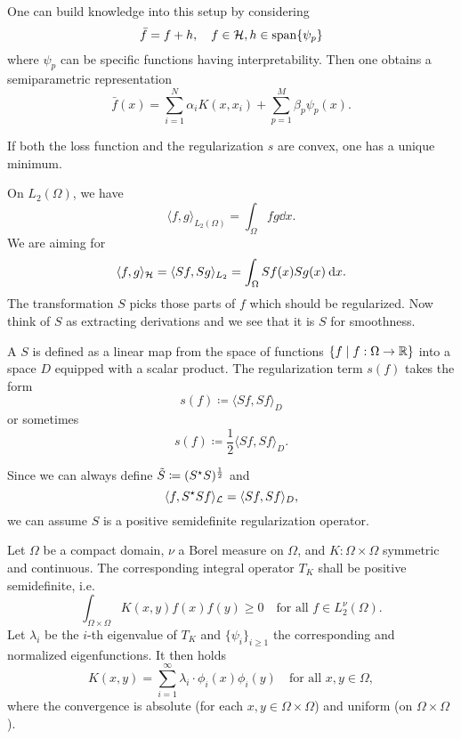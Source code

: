 \documentclass[../lecture-notes.tex]{subfiles}
\begin{document}
\begin{remark}
One can build knowledge into this setup by considering
\[
\bar{f} = f + h, \quad f \in \mathcal{H}, h \in \operatorname*{span}\{ \psi_p \}
\]
where $\psi_p$ can be specific functions having interpretability.
Then one obtains a semiparametric representation
\[
\bar{f}(x) = \sum_{i=1}^N \alpha_i K(x, x_i) + \sum_{p=1}^M \beta_p \psi_p(x).
\]
\end{remark}
\begin{remark}
If both the loss function and the regularization $s$ are convex, one has a unique minimum.
\end{remark}
On $L_2(\Omega)$, we have
\[
	\langle f, g \rangle_{L_2(\Omega)} = \int_\Omega fg \dd x.
\]
We are aiming for
\[
	\langle f, g \rangle_{\mathcal{H}} = \langle Sf, Sg \rangle_{L_2} = \int_\Omega Sf(x) Sg(x) \:\mathrm{d} x.
\]
The transformation $S$ picks those parts of $f$ which should be regularized. Now think of $S$ as extracting derivations and we see that it is $S$ for smoothness.
\begin{definition} %
\label{thm:42}
A  $S$ is defined as a linear map from the space of functions $\{ f \mid f : \Omega \to \mathbb{R} \}$ into a space $D$ equipped with a scalar product.
The regularization term $s(f)$ takes the form
\[
	s(f) \coloneqq \langle Sf, Sf \rangle_D
\]
or sometimes
\[
	s(f) \coloneqq \frac{1}{2} \langle Sf, Sf \rangle_D.
\]
\end{definition}
\begin{remark}
Since we can always define $\tilde{S} \coloneqq (S^{\star} S)^{\frac{1}{2}}$ and
\[
	\langle f, S^{\star} S f \rangle_{\mathcal{L}} = \langle Sf, Sf \rangle_D,
\]
we can assume $S$ is a positive semidefinite regularization operator.
\end{remark}
\begin{theorem} %
\label{thm:43}
Let $\Omega$ be a compact domain, $\nu$ a Borel measure on $\Omega$, and $K : \Omega \times \Omega$ symmetric and continuous.
The corresponding integral operator $T_K$ shall be positive semidefinite, i.e.
\[
	\int_{\Omega \times \Omega} K(x, y) f(x) f(y) \geq 0 \quad \text{for all } f \in L_2^\nu(\Omega).
\]
Let $\lambda_i$ be the $i$-th eigenvalue of $T_K$ and $\{ \psi_i \}_{i \geq 1}$ the corresponding and normalized eigenfunctions.
It then holds
\[
	K(x, y) = \sum_{i=1}^\infty \lambda_i \cdot \phi_i(x) \phi_i(y) \quad \text{for all } x, y \in \Omega,
\]
where the convergence is absolute (for each $x, y \in \Omega \times \Omega$) and uniform (on $\Omega \times \Omega$).
\end{theorem}
\end{document}
